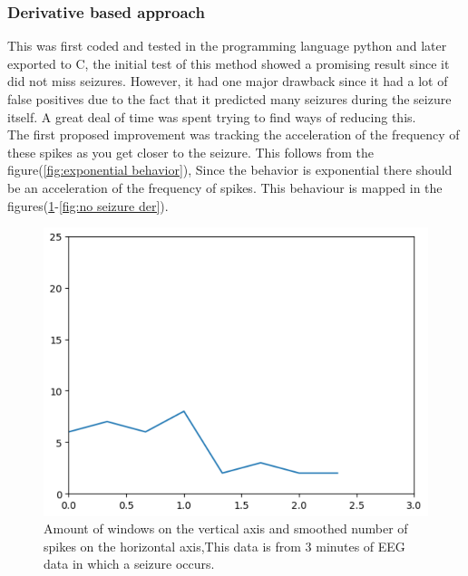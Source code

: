 \subsubsection{Derivative based approach}

This was first coded and tested in the programming language python and later exported to C, the initial test of this method showed a promising result since it did not miss seizures. However, it had one major drawback since it had a lot of false positives due to the fact that it predicted many seizures during the seizure itself. A great deal of time was spent trying to find ways of reducing this.\\

The first proposed improvement was tracking the acceleration of the frequency of these spikes as you get closer to the seizure. This follows from the figure(\ref{fig:exponential behavior}), Since the behavior is exponential there should be an acceleration of the frequency of spikes. This behaviour is mapped in the figures(\ref{fig:seizure der}-\ref{fig:no seizure der}). 

\begin{figure}
    \centering
 \includegraphics[width=0.4\textheight]{images/Seizure.png}
    \caption{Amount of windows on the vertical axis and smoothed number of spikes on the horizontal axis,This data is from 3 minutes of EEG data in which a seizure occurs.}
    \label{fig:seizure der}
\end{figure}

